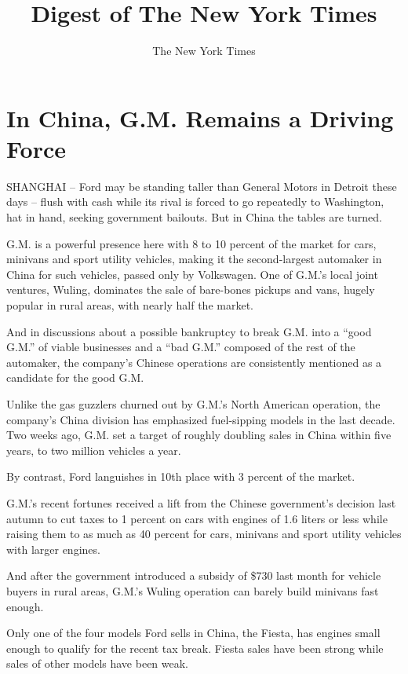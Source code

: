 \documentclass[12pt,a4paper,onecolumn]{article}
\title{Digest of The New York Times}
\author{The New York Times}
\begin{document}
\date{}

\tableofcontents
\pagebreak
\section{In China, G.M. Remains a Driving Force}

SHANGHAI -- Ford may be standing taller than General Motors in Detroit these days -- flush with cash
while its rival is forced to go repeatedly to Washington, hat in hand, seeking government bailouts.
But in China the tables are turned.

G.M. is a powerful presence here with 8 to 10 percent of the market for cars, minivans and sport
utility vehicles, making it the second-largest automaker in China for such vehicles, passed only by
Volkswagen. One of G.M.'s local joint ventures, Wuling, dominates the sale of bare-bones pickups and
vans, hugely popular in rural areas, with nearly half the market.

And in discussions about a possible bankruptcy to break G.M. into a ``good G.M.'' of viable
businesses and a ``bad G.M.'' composed of the rest of the automaker, the company's Chinese
operations are consistently mentioned as a candidate for the good G.M.

Unlike the gas guzzlers churned out by G.M.'s North American operation, the company's China division
has emphasized fuel-sipping models in the last decade. Two weeks ago, G.M. set a target of roughly
doubling sales in China within five years, to two million vehicles a year.

By contrast, Ford languishes in 10th place with 3 percent of the market.

G.M.'s recent fortunes received a lift from the Chinese government's decision last autumn to cut
taxes to 1 percent on cars with engines of 1.6 liters or less while raising them to as much as 40
percent for cars, minivans and sport utility vehicles with larger engines.

And after the government introduced a subsidy of \$730 last month for vehicle buyers in rural areas,
G.M.'s Wuling operation can barely build minivans fast enough.

Only one of the four models Ford sells in China, the Fiesta, has engines small enough to qualify for
the recent tax break. Fiesta sales have been strong while sales of other models have been weak.
\end{document}
